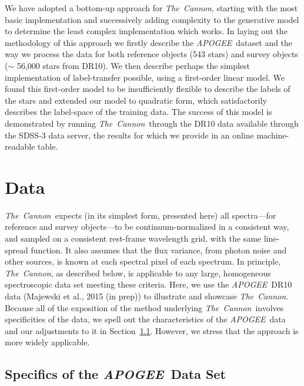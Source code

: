 \documentclass[12pt, preprint]{aastex}
\newcommand{\sectionname}{Section}
\newcommand{\tc}{\textsl{The~Cannon}}
\newcommand{\apogee}{\textsl{APOGEE}}
\begin{document}
We have adopted a bottom-up approach for \tc, starting with the most basic implementation and successively adding complexity to the generative model to determine the least complex implementation which works.  
In laying out the methodology of this approach we firstly describe the \apogee\ dataset and the way we process the data for both reference objects (543 stars) and survey objects ($\sim$ 56,000 stars from DR10). 
We then describe perhaps the simplest implementation of label-transfer possible, using a first-order linear model. We found this first-order model to be insufficiently flexible to describe the labels of the stars and extended our model to quadratic form, which satisfactorily describes the label-space of the training data.
The success of this model is demonstrated by running \tc\ through the DR10 data available through the SDSS-3 data server, the results for which we provide in an online machine-readable table. %

\section{Data}\label{sec:Data}
\tc\ expects (in its simplest form, presented here)
all spectra---for reference and survey objects---to be continuum-normalized in a consistent way,
and sampled on a consistent rest-frame wavelength grid, with the same line-spread function.
It also assumes that the flux variance, from photon noise and other sources, is known at each spectral pixel of each spectrum.
In principle, \tc, as described below, is applicable to any large, homogeneous spectroscopic data set
meeting these criteria.
Here, we use the \apogee\ DR10 data (Majewski et al., 2015 (in prep)) to illustrate and showcase \tc.
Because all of the exposition of the method underlying \tc\ involves specificities of the data,
we spell out the characteristics of the \apogee\ data and our adjustments to it in \sectionname~\ref{sec:Apogee_as_worked_Example}. However, we stress that the approach is more widely applicable. 

\subsection{Specifics of the \apogee\ Data Set}
\label{sec:Apogee_as_worked_Example}
\end{document}
